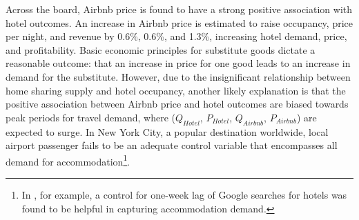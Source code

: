 \documentclass[12pt]{article}
\begin{document}
			\par
			Across the board, Airbnb price is found to have a strong positive association with hotel outcomes. An increase in Airbnb price is estimated to raise occupancy, price per night, and revenue by 0.6\%, 0.6\%, and 1.3\%, increasing hotel demand, price, and profitability. Basic economic principles for substitute goods dictate a reasonable outcome: that an increase in price for one good leads to an increase in demand for the substitute. However, due to the insignificant relationship between home sharing supply and hotel occupancy, another likely explanation is that the positive association between Airbnb price and hotel outcomes are biased towards peak periods for travel demand, where ($Q_{Hotel}$, $P_{Hotel}$, $Q_{Airbnb}$, $P_{Airbnb}$) are expected to surge. In New York City, a popular destination worldwide, local airport passenger fails to be an adequate control variable that encompasses all demand for accommodation\footnote{In \citet{farronato2018welfare}, for example, a control for one-week lag of Google searches for hotels was found to be helpful in capturing accommodation demand.}.
			
\end{document}
